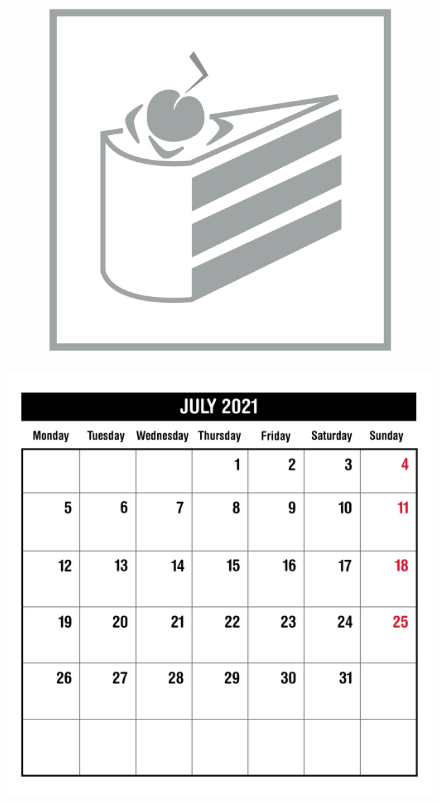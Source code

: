 \begin{figure}[H]
\begin{subfigure}[l]{0.195\linewidth}
  \end{subfigure}
  \begin{subfigure}[l]{0.195\linewidth}
    \includegraphics[width=\textwidth]{Sources/PortalIcons/d10.jpg}
  \end{subfigure}
\end{figure}


\newpage
\begin{figure}[H]
    \includegraphics[width=\textwidth]{Sources/MonthViews/July21.jpg}
\end{figure}


